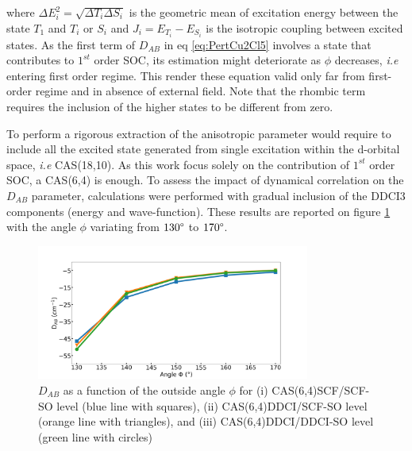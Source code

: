 \documentclass[10pt]{report}
\numberwithin{equation}{section}
\begin{document}
where $\Delta E^2_i=\sqrt{\Delta T_i \Delta S_i}$ is the geometric mean of excitation energy between the state $T_1$ and $T_i$ or $S_i$ and $J_i=E_{T_i}-E_{S_i}$ is the isotropic coupling between excited states.
As the first term of $D_{AB}$ in eq \ref{eq:PertCu2Cl5} involves a state that contributes to $1^{st}$ order SOC, its estimation might deteriorate as $\phi$ decreases, \textit{i.e} entering first order regime.
This render these equation valid only far from first-order regime and in absence of external field. Note that the rhombic term requires the inclusion of the higher states to be different from zero.

To perform a rigorous extraction of the anisotropic parameter would require to include all the excited state generated from single excitation within the d-orbital space, \textit{i.e} CAS(18,10).
As this work focus solely on the contribution of $1^{st}$ order SOC, a CAS(6,4) is enough. 
To assess the impact of dynamical correlation on the $D_{AB}$ parameter, calculations were performed with gradual inclusion of the DDCI3 components (energy and wave-function).
These results are reported on figure \ref{DABangle} with the angle $\phi$ variating from $130\degree$ to $170\degree$.

\begin{figure}[h!]
    \centering
    \includegraphics[width=0.8\textwidth]{Images/D_AB_Angle2.png}
    \caption{$D_{AB}$ as a function of the outside angle $\phi$ for (i) CAS(6,4)SCF/SCF-SO level (blue line with squares), (ii) CAS(6,4)DDCI/SCF-SO level (orange line with triangles), and (iii) CAS(6,4)DDCI/DDCI-SO level (green line with circles) }
    \label{DABangle}
\end{figure}
\end{document}
